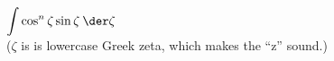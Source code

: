 $\displaystyle \int \cos^n \zeta \sin \zeta\:\der \zeta$\\
($\zeta$ is is lowercase Greek zeta, which makes the ``z'' sound.)  \answercheck

